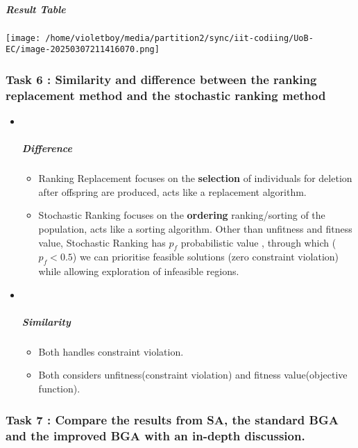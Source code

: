 \documentclass[
]{article}
\begin{document}
\subparagraph{Result Table}\label{result-table}

\texttt{[image: /home/violetboy/media/partition2/sync/iit-codiing/UoB-EC/image-20250307211416070.png]}

\subsubsection{\texorpdfstring{Task 6 : Similarity and difference
between the ranking replacement method and the stochastic ranking method
}{Task 6 : Similarity and difference between the ranking replacement method and the stochastic ranking method }}\label{task-6--similarity-and-difference-between-the-ranking-replacement-method-and-the-stochastic-ranking-method}

\begin{itemize}
\item ~
  \subparagraph{Difference}\label{difference}

  \begin{itemize}
  \item
    Ranking Replacement focuses on the \textbf{selection} of individuals
    for deletion after offspring are produced, acts like a replacement
    algorithm.
  \item
    Stochastic Ranking focuses on the \textbf{ordering} ranking/sorting
    of the population, acts like a sorting algorithm. Other than
    unfitness and fitness value, Stochastic Ranking has \(p_f\)
    probabilistic value , through which (\(p_f<0.5\)) we can prioritise
    feasible solutions (zero constraint violation) while allowing
    exploration of infeasible regions.
  \end{itemize}
\item ~
  \subparagraph{Similarity}\label{similarity}

  \begin{itemize}
  \item
    Both handles constraint violation.
  \item
    Both considers unfitness(constraint violation) and fitness
    value(objective function).
  \end{itemize}
\end{itemize}

\subsubsection{Task 7 : Compare the results from SA, the standard BGA
and the improved BGA with an in-depth
discussion.}\label{task-7---compare-the-results-from-sa-the-standard-bga-and-the-improved-bga-with-an-in-depth-discussion}
\end{document}
